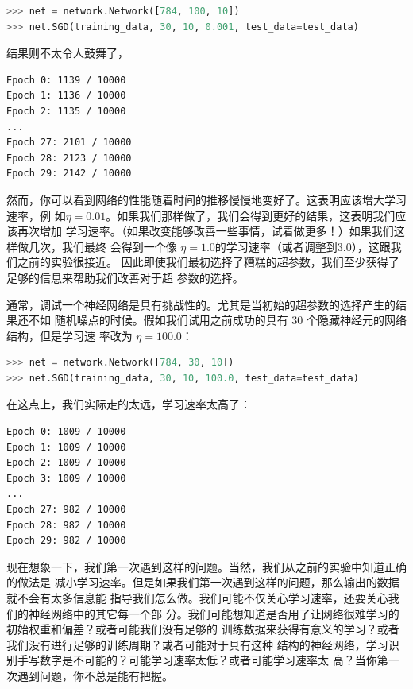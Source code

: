 \begin{lstlisting}[language=Python]
>>> net = network.Network([784, 100, 10])
>>> net.SGD(training_data, 30, 10, 0.001, test_data=test_data)
\end{lstlisting}

结果则不太令人鼓舞了，

\begin{lstlisting}[language=sh]
Epoch 0: 1139 / 10000
Epoch 1: 1136 / 10000
Epoch 2: 1135 / 10000
...
Epoch 27: 2101 / 10000
Epoch 28: 2123 / 10000
Epoch 29: 2142 / 10000
\end{lstlisting}

然而，你可以看到网络的性能随着时间的推移慢慢地变好了。这表明应该增大学习速率，例
如$\eta = 0.01$。如果我们那样做了，我们会得到更好的结果，这表明我们应该再次增加
学习速率。（如果改变能够改善一些事情，试着做更多！）如果我们这样做几次，我们最终
会得到一个像 $\eta = 1.0$的学习速率（或者调整到$3.0$），这跟我们之前的实验很接近。
因此即使我们最初选择了糟糕的超参数，我们至少获得了足够的信息来帮助我们改善对于超
参数的选择。

通常，调试一个神经网络是具有挑战性的。尤其是当初始的超参数的选择产生的结果还不如
随机噪点的时候。假如我们试用之前成功的具有 30 个隐藏神经元的网络结构，但是学习速
率改为 $\eta = 100.0$：

\begin{lstlisting}[language=Python]
>>> net = network.Network([784, 30, 10])
>>> net.SGD(training_data, 30, 10, 100.0, test_data=test_data)
\end{lstlisting}

在这点上，我们实际走的太远，学习速率太高了：

\begin{lstlisting}[language=sh]
Epoch 0: 1009 / 10000
Epoch 1: 1009 / 10000
Epoch 2: 1009 / 10000
Epoch 3: 1009 / 10000
...
Epoch 27: 982 / 10000
Epoch 28: 982 / 10000
Epoch 29: 982 / 10000
\end{lstlisting}

现在想象一下，我们第一次遇到这样的问题。当然，我们从之前的实验中知道正确的做法是
减小学习速率。但是如果我们第一次遇到这样的问题，那么输出的数据就不会有太多信息能
指导我们怎么做。我们可能不仅关心学习速率，还要关心我们的神经网络中的其它每一个部
分。我们可能想知道是否用了让网络很难学习的初始权重和偏差？或者可能我们没有足够的
训练数据来获得有意义的学习？或者我们没有进行足够的训练周期？或者可能对于具有这种
结构的神经网络，学习识别手写数字是不可能的？可能学习速率太低？或者可能学习速率太
高？当你第一次遇到问题，你不总是能有把握。

